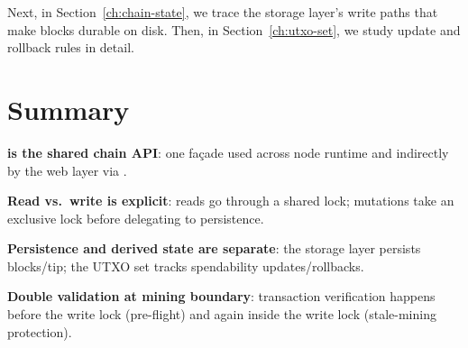 Next, in Section~\ref{ch:chain-state}, we trace the storage layer's write paths that make blocks durable on disk. Then, in Section~\ref{ch:utxo-set}, we study update and rollback rules in detail.

\section{Summary}
\label{sec:ch09-2-summary}

\begin{chaptersummary}
\item \textbf{ is the shared chain API}: one façade used across node runtime and indirectly by the web layer via .
\item \textbf{Read vs.\ write is explicit}: reads go through a shared lock; mutations take an exclusive lock before delegating to persistence.
\item \textbf{Persistence and derived state are separate}: the storage layer persists blocks/tip; the UTXO set tracks spendability updates/rollbacks.
\item \textbf{Double validation at mining boundary}: transaction verification happens before the write lock (pre-flight) and again inside the write lock (stale-mining protection).
\end{chaptersummary}
